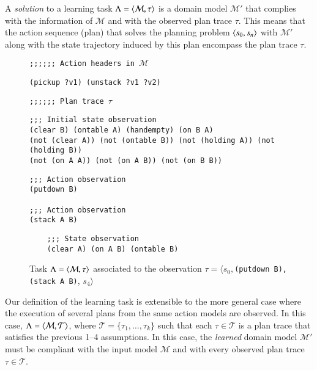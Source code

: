 A {\em solution} to a learning task $\Lambda={\langle \mathcal{M},\tau \rangle}$ is a domain model $\mathcal{M}'$ that complies with the information of $\mathcal{M}$ and with the observed plan trace $\tau$. \textcolor[rgb]{1.00,0.00,0.00}{This means that the action sequence (plan) that solves the planning problem ${\langle s_0,s_n \rangle}$ with $\mathcal{M}'$ along with the state trajectory induced by this plan encompass the plan trace $\tau$.}

\begin{figure}[hbt!]
{\footnotesize\tt ;;;;;; Action headers in $\mathcal{M}$}
\begin{footnotesize}
\begin{verbatim}
(pickup ?v1) (unstack ?v1 ?v2)
\end{verbatim}
\end{footnotesize}
\vspace{0.2cm}
{\footnotesize\tt ;;;;;; Plan trace $\tau$}
\begin{footnotesize}
\begin{verbatim}
;;; Initial state observation
(clear B) (ontable A) (handempty) (on B A)
(not (clear A)) (not (ontable B)) (not (holding A)) (not (holding B))
(not (on A A)) (not (on A B)) (not (on B B))
\end{verbatim}
\end{footnotesize}

\begin{footnotesize}
\begin{verbatim}
;;; Action observation
(putdown B)

;;; Action observation
(stack A B)
\end{verbatim}
\end{footnotesize}

\begin{footnotesize}
	\begin{verbatim}
	;;; State observation
	(clear A) (on A B) (ontable B)
	\end{verbatim}
\end{footnotesize}

 \caption{\small Task $\Lambda={\langle \mathcal{M},\tau \rangle}$ associated to the observation $\tau=\langle s_0,${\small\tt (putdown\ B),(stack\ A\ B)}, $s_4\rangle$}
\label{fig:example-plans}
\end{figure}

Our definition of the learning task is extensible to the more general case where the execution of several plans from the same action models are observed. In this case, $\Lambda={\langle \mathcal{M},\mathcal{T} \rangle}$, where $\mathcal{T}=\{\tau_1,\ldots,\tau_{k}\}$ such that each $\tau\in \mathcal{T}$ is a plan trace that satisfies the previous 1--4 assumptions. In this case, the {\em learned} domain model $\mathcal{M}'$ must be compliant with the input model $\mathcal{M}$ and with every observed plan trace $\tau\in \mathcal{T}$.


